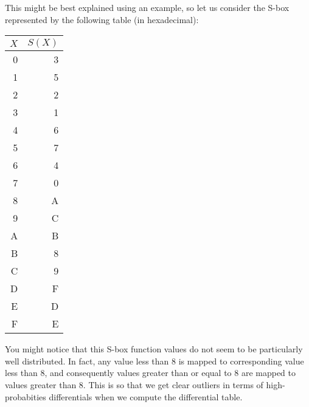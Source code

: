 This might be best explained using an example, so let us consider the S-box 
represented by the following table (in hexadecimal):
\begin{center}
\begin{tabular}{|r|r|}
\hline
$X$ & $S(X)$ \\\hline
0 & 3 \\\hline
1 & 5 \\\hline
2 & 2 \\\hline
3 & 1 \\\hline
4 & 6 \\\hline
5 & 7 \\\hline
6 & 4 \\\hline
7 & 0 \\\hline
8 & A \\\hline
9 & C \\\hline
A & B \\\hline
B & 8 \\\hline
C & 9 \\\hline
D & F \\\hline
E & D \\\hline
F & E \\\hline
\end{tabular}
\end{center}
You might notice that this S-box function values do not seem to be particularly
well distributed. In fact, any value less than 8 is mapped to corresponding
value less than 8, and consequently values greater than or equal to 8 are mapped
to values greater than 8. This is so that we get clear outliers in terms of
high-probabities differentials when we compute the differential table.

